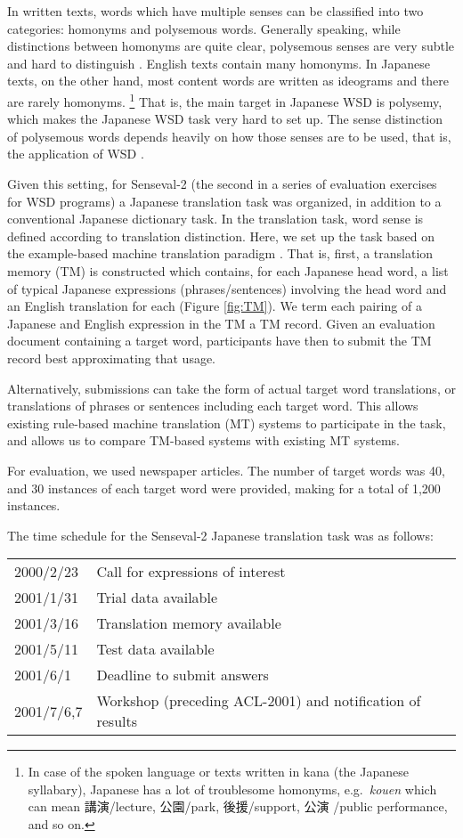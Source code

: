 In written texts, words which have multiple senses can be classified
into two categories: homonyms and polysemous words.  Generally speaking,
while distinctions between homonyms are quite clear, polysemous senses
are very subtle and hard to distinguish \cite{SENSEVAL1}.  English texts
contain many homonyms.  In Japanese texts, on the other hand, most
content words are written as ideograms and there are rarely homonyms.
\footnote{ In case of the spoken language or texts written in kana (the
  Japanese syllabary), Japanese has a lot of troublesome homonyms, e.g.\
  {\it kouen} which can mean 講演/lecture, 公園/park, 後援/support, 公演
  /public performance, and so on.}  That is, the main target in Japanese
WSD is polysemy, which makes the Japanese WSD task very hard to set up.
The sense distinction of polysemous words depends heavily on how those
senses are to be used, that is, the application of WSD \cite{Ide00}.
  
Given this setting, for {\sc Senseval-2} (the second in a series of
evaluation exercises for WSD programs) a Japanese translation task was
organized, in addition to a conventional Japanese dictionary task. In
the translation task, word sense is defined according to translation
distinction.  Here, we set up the task based on the example-based
machine translation paradigm \cite{Nagao81,DDMT01}. That is, first, a
translation memory (TM) is constructed which contains, for each Japanese
head word, a list of typical Japanese expressions (phrases/sentences)
involving the head word and an English translation for each (Figure
\ref{fig:TM}).  We term each pairing of a Japanese and English
expression in the TM a TM record.  Given an evaluation document
containing a target word, participants have then to submit the TM record
best approximating that usage.

Alternatively, submissions can take the form of actual target word
translations, or translations of phrases or sentences including each
target word.  This allows existing rule-based machine translation (MT)
systems to participate in the task, and allows us to compare TM-based systems
with existing MT systems.

For evaluation, we used newspaper articles.  The number of target words
was 40, and 30 instances of each target word were provided, making for a
total of 1,200 instances.

The time schedule for the {\sc Senseval-2} Japanese translation task was
as follows:
\begin{center}
\begin{tabular}{ll}
 2000/2/23 & Call for expressions of interest \\
 2001/1/31 & Trial data available \\
 2001/3/16 & Translation memory available \\
 2001/5/11 & Test data available \\
 2001/6/1 & Deadline to submit answers \\
 2001/7/6,7 & Workshop (preceding ACL-2001) and notification of results \\
\end{tabular}
\end{center}

